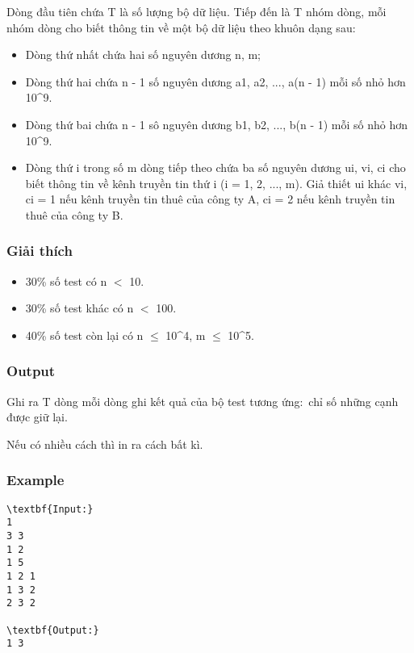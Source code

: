 Dòng đầu tiên chứa T là số lượng bộ dữ liệu. Tiếp đến là T nhóm dòng, mỗi nhóm dòng cho biết thông tin về một bộ dữ liệu theo khuôn dạng sau:
\begin{itemize}
	\item Dòng thứ nhất chứa hai số nguyên dương n, m;
	\item Dòng thứ hai chứa n - 1 số nguyên dương a1, a2, ..., a(n - 1) mỗi số nhỏ hơn 10\textasciicircum9.
	\item Dòng thứ bai chứa n - 1 sô nguyên dương b1, b2, ..., b(n - 1) mỗi số nhỏ hơn 10\textasciicircum9.
	\item Dòng thứ i trong số m dòng tiếp theo chứa ba số nguyên dương ui, vi, ci cho biết thông tin về kênh truyền tin thứ i (i = 1, 2, ..., m). Giả thiết ui khác vi, ci = 1 nếu kênh truyền tin thuê của công ty A, ci = 2 nếu kênh truyền tin thuê của công ty B.
\end{itemize}

\subsubsection{Giải thích}
\begin{itemize}
	\item 30\% số test có n $<$ 10.
	\item 30\% số test khác có n $<$ 100.
	\item 40\% số test còn lại có n  $\le$  10\textasciicircum4, m  $\le$  10\textasciicircum5.
\end{itemize}

\subsubsection{Output}

Ghi ra T dòng mỗi dòng ghi kết quả của bộ test tương ứng: chỉ số những cạnh được giữ lại.

Nếu có nhiều cách thì in ra cách bất kì.

\subsubsection{Example}
\begin{verbatim}
\textbf{Input:}
1
3 3
1 2
1 5
1 2 1
1 3 2
2 3 2

\textbf{Output:}
1 3
\end{verbatim}
